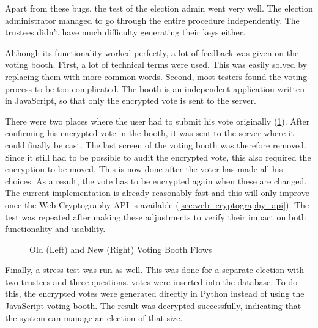 \par Apart from these bugs, the test of the election admin went very well. The election administrator managed to go through the entire procedure independently. The trustees didn't have much difficulty generating their keys either.

\par Although its functionality worked perfectly, a lot of feedback was given on the voting booth. First, a lot of technical terms were used. This was easily solved by replacing them with more common words. Second, most testers found the voting process to be too complicated. The booth is an independent application written in JavaScript, so that only the encrypted vote is sent to the server.

\par There were two places where the user had to submit his vote originally (\ref{fig:be:voting_booth_flows}). After confirming his encrypted vote in the booth, it was sent to the server where it could finally be cast. The last screen of the voting booth was therefore removed. Since it still had to be possible to audit the encrypted vote, this also required the encryption to be moved. This is now done after the voter has made all his choices. As a result, the vote has to be encrypted again when these are changed. The current implementation is already reasonably fast and this will only improve once the Web Cryptography API is available (\ref{sec:web_cryptography_api}). The test was repeated after making these adjustments to verify their impact on both functionality and usability.
 
\begin{figure}
  \centering
  \begin{minipage}{.45\linewidth}
    \centering
    \scalebox{.6}{}
  \end{minipage}
  \quad
  \begin{minipage}{.45\linewidth}
    \centering
    \scalebox{.6}{}
  \end{minipage}
  \caption{Old (Left) and New (Right) Voting Booth Flows}
  \label{fig:be:voting_booth_flows}
\end{figure}

\par Finally, a stress test was run as well. This was done for a separate election with two trustees and three questions.  votes were inserted into the database. To do this, the encrypted votes were generated directly in Python instead of using the JavaScript voting booth. The result was decrypted successfully, indicating that the system can manage an election of that size.


